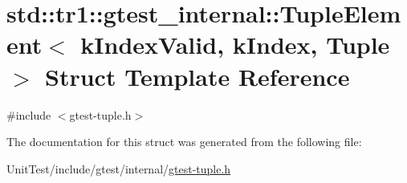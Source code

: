 \hypertarget{structstd_1_1tr1_1_1gtest__internal_1_1_tuple_element}{\section{std\+:\+:tr1\+:\+:gtest\+\_\+internal\+:\+:Tuple\+Element$<$ k\+Index\+Valid, k\+Index, Tuple $>$ Struct Template Reference}
\label{structstd_1_1tr1_1_1gtest__internal_1_1_tuple_element}
}


{\ttfamily \#include $<$gtest-\/tuple.\+h$>$}



The documentation for this struct was generated from the following file\+:\begin{DoxyCompactItemize}
\item 
Unit\+Test/include/gtest/internal/\hyperlink{gtest-tuple_8h}{gtest-\/tuple.\+h}\end{DoxyCompactItemize}
